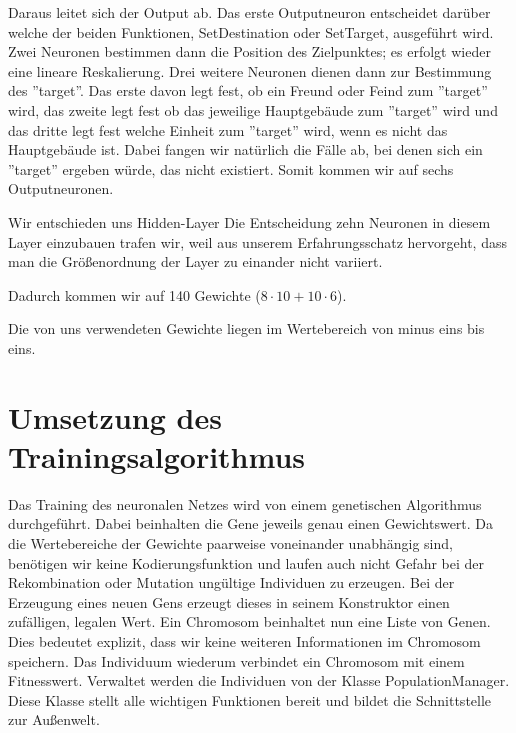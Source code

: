 \documentclass[
	12pt,
	a4paper,
	BCOR10mm,
	DIV14,
	headsepline,
	usegeometry,
]{scrreprt}
\begin{document}
Daraus leitet sich der Output ab.
Das erste Outputneuron entscheidet darüber welche der beiden Funktionen, SetDestination oder SetTarget, ausgeführt wird.
Zwei Neuronen bestimmen dann die Position des Zielpunktes; es erfolgt wieder eine lineare Reskalierung.
Drei weitere Neuronen dienen dann zur Bestimmung des ''target''.
Das erste davon legt fest, ob ein Freund oder Feind zum ''target'' wird, das zweite legt fest ob das jeweilige Hauptgebäude zum ''target'' wird und das dritte legt fest welche Einheit zum ''target'' wird, wenn es nicht das Hauptgebäude ist.
Dabei fangen wir natürlich die Fälle ab, bei denen sich ein ''target'' ergeben würde, das nicht existiert.
Somit kommen wir auf sechs Outputneuronen.

Wir entschieden uns  Hidden-Layer 
Die Entscheidung zehn Neuronen in diesem Layer einzubauen trafen wir, weil aus unserem Erfahrungsschatz hervorgeht, dass man die Größenordnung der Layer zu einander nicht variiert.

Dadurch kommen wir auf 140 Gewichte ($8 \cdot 10 + 10 \cdot 6$).

Die von uns verwendeten Gewichte liegen im Wertebereich von minus eins bis eins.

\section{Umsetzung des Trainingsalgorithmus}
Das Training des neuronalen Netzes wird von einem genetischen Algorithmus durchgeführt.
Dabei beinhalten die Gene jeweils genau einen Gewichtswert.
Da die Wertebereiche der Gewichte paarweise voneinander unabhängig sind, benötigen wir keine Kodierungsfunktion und laufen auch nicht Gefahr bei der Rekombination oder Mutation ungültige Individuen zu erzeugen.
Bei der Erzeugung eines neuen Gens erzeugt dieses in seinem Konstruktor einen zufälligen, legalen Wert.
Ein Chromosom beinhaltet nun eine Liste von Genen.
Dies bedeutet explizit, dass wir keine weiteren Informationen im Chromosom speichern.
Das Individuum wiederum verbindet ein Chromosom mit einem Fitnesswert.
Verwaltet werden die Individuen von der Klasse PopulationManager.
Diese Klasse stellt alle wichtigen Funktionen bereit und bildet die Schnittstelle zur Außenwelt.
\end{document}
